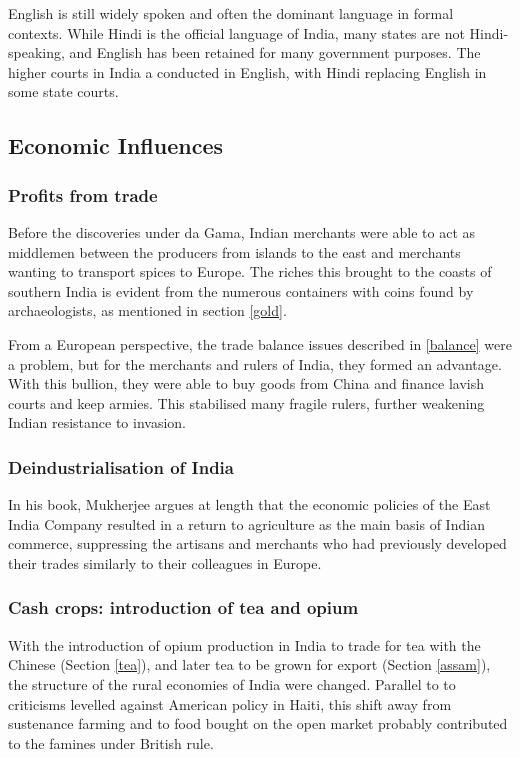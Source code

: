 \documentclass[11pt, a4paper, headings=standardclasses]{scrartcl}
\begin{document}
English is still widely spoken and often the dominant language in formal contexts. While Hindi is the official language of India, many states are not Hindi-speaking, and English has been retained for many government purposes. The higher courts in India a conducted in English, with Hindi replacing English in some state courts.\autocite{english}

\subsection{Economic Influences}

\subsubsection{Profits from trade}

Before the discoveries under da Gama, Indian merchants were able to act as middlemen between the producers from islands to the east and merchants wanting to transport spices to Europe. The riches this brought to the coasts of southern India is evident from the numerous containers with coins found by archaeologists, as mentioned in section \ref{gold}.

From a European perspective, the trade balance issues described in \ref{balance} were a problem, but for the merchants and rulers of India, they formed an advantage. With this bullion, they were able to buy goods from China and finance lavish courts and keep armies.\autocite[397]{FT} This stabilised many fragile rulers, further weakening Indian resistance to invasion.

\subsubsection{Deindustrialisation of India}

In his book, Mukherjee argues at length that the economic policies of the East India Company resulted in a return to agriculture as the main basis of Indian commerce, suppressing the artisans and merchants who had previously developed their trades similarly to their colleagues in Europe.\autocite[Chapter 5, Sections 1 and 2]{RF}

\subsubsection{Cash crops: introduction of tea and opium}

With the introduction of opium production in India to trade for tea with the Chinese (Section \ref{tea}), and later tea to be grown for export (Section \ref{assam}), the structure of the rural economies of India were changed. Parallel to to criticisms levelled against American policy in Haiti, this shift away from sustenance farming and to food bought on the open market probably contributed to the famines under British rule.
\end{document}
